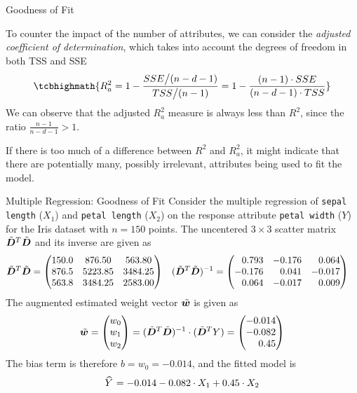 \begin{frame}{Goodness of Fit}

To counter the impact of the number of attributes,
we can consider the {\em adjusted coefficient of determination}, which
takes into account the degrees of freedom in both TSS and SSE
\begin{align*}
    \tcbhighmath{
    R_a^2 = 1 - \frac{SSE \big/ (n-d-1)}{TSS \big/ (n-1)} = 
1 - \frac{(n-1) \cdot SSE}{ (n-d-1) \cdot TSS}}
\end{align*}
We can observe that the adjusted $R_a^2$ measure is always less than
$R^2$, since the ratio $\tfrac{n-1}{n-d-1} > 1$. 

\medskip

If there is too much of
a difference between $R^2$ and $R_a^2$, it might indicate that there are
potentially many, possibly irrelevant, attributes being used to fit the
model.
\end{frame}

%
%
\begin{frame}{Multiple Regression: Goodness of Fit}
	Consider the multiple regression of 
{\tt sepal length} ($X_1$) and {\tt petal
    length} ($X_2$) on the response attribute {\tt petal width} ($Y$)
for the Iris dataset with $n=150$ points. 
%
The uncentered $3 \times 3$ scatter matrix
$\tilde{{\boldsymbol D}}^T\tilde{{\boldsymbol D}}$ and its inverse are given as
\begin{align*}
    \abD^T\abD & = \matr{
150.0 & 876.50  & 563.80\\
876.5 & 5223.85 & 3484.25\\
563.8 & 3484.25 & 2583.00 }
&
(\abD^T\abD)^{-1} & = \amatr{r}{
0.793 & -0.176 & 0.064\\
-0.176 &  0.041 & -0.017\\
0.064 & -0.017 &  0.009}
\end{align*}
The augmented estimated weight vector $\tilde{{\boldsymbol w}}$ is given as
\begin{align*}
    \abw = \matr{w_0\\w_1\\w_2} = (\abD^T\abD)^{-1} \cdot (\abD^T Y) = 
    \amatr{r}{-0.014\\ -0.082\\ 0.45}
\end{align*}
The bias term is therefore $b=w_0=-0.014$, and
the fitted model is 
\begin{align*}
    \mkern 1.5mu\widehat{\mkern-1.5muY}\mkern 1.5mu = -0.014 -0.082 \cdot X_1 + 0.45\cdot X_2
\end{align*}

\end{frame}



